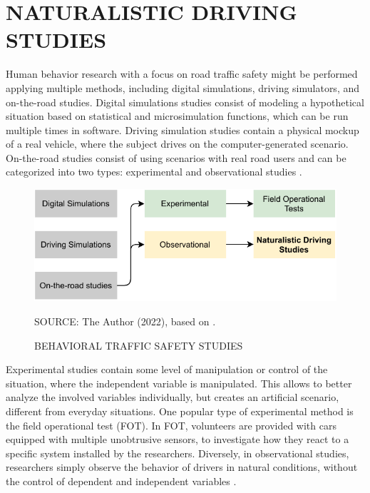 

\section{NATURALISTIC DRIVING STUDIES} \label{nds}

Human behavior research with a focus on road traffic safety might be performed applying multiple methods, including digital simulations, driving simulators, and on-the-road studies. Digital simulations studies consist of modeling a hypothetical situation based on statistical and microsimulation functions, which can be run multiple times in software. Driving simulation studies contain a physical mockup of a real vehicle, where the subject drives on the computer-generated scenario. On-the-road studies consist of using scenarios with real road users and can be categorized into two types: experimental and observational studies \cite{Shinar2017}. 

\begin{figure}[!htbp]
    \centering\footnotesize
    \captionsetup{font=footnotesize}
    \caption{BEHAVIORAL TRAFFIC SAFETY STUDIES}
    \includegraphics{fig/studies.pdf}
    \label{fig:shinar}
    \par SOURCE: The Author (2022), based on \textcite{Shinar2017}.
\end{figure}

Experimental studies contain some level of manipulation or control of the situation, where the independent variable is manipulated. This allows to better analyze the involved variables individually, but creates an artificial scenario, different from everyday situations. One popular type of experimental method is the field operational test (FOT). In FOT, volunteers are provided with cars equipped with multiple unobtrusive sensors, to investigate how they react to a specific system installed by the researchers. Diversely, in observational studies, researchers simply observe the behavior of drivers in natural conditions, without the control of dependent and independent variables \cite{Shinar2017}. 


